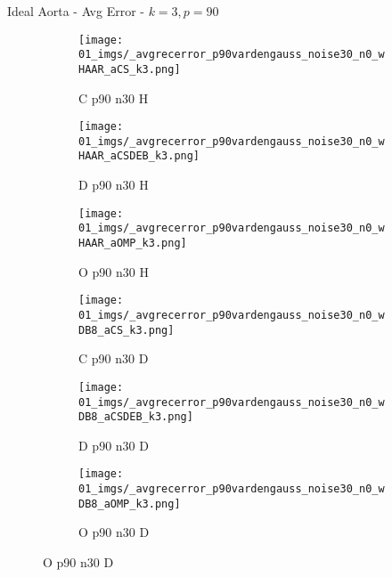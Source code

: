 \begin{frame}{Ideal Aorta - Avg Error - $k=3,p=90$}{}
\begin{figure}
\begin{subfigure}{0.13\textwidth}
\texttt{[image: 01\_imgs/\_avgrecerror\_p90vardengauss\_noise30\_n0\_wHAAR\_aCS\_k3.png]}
\caption*{\tiny C p90 n30 H}
\end{subfigure}
\begin{subfigure}{0.13\textwidth}
\texttt{[image: 01\_imgs/\_avgrecerror\_p90vardengauss\_noise30\_n0\_wHAAR\_aCSDEB\_k3.png]}
\caption*{\tiny D p90 n30 H}
\end{subfigure}
\begin{subfigure}{0.13\textwidth}
\texttt{[image: 01\_imgs/\_avgrecerror\_p90vardengauss\_noise30\_n0\_wHAAR\_aOMP\_k3.png]}
\caption*{\tiny O p90 n30 H}
\end{subfigure}
\begin{subfigure}{0.13\textwidth}
\texttt{[image: 01\_imgs/\_avgrecerror\_p90vardengauss\_noise30\_n0\_wDB8\_aCS\_k3.png]}
\caption*{\tiny C p90 n30 D}
\end{subfigure}
\begin{subfigure}{0.13\textwidth}
\texttt{[image: 01\_imgs/\_avgrecerror\_p90vardengauss\_noise30\_n0\_wDB8\_aCSDEB\_k3.png]}
\caption*{\tiny D p90 n30 D}
\end{subfigure}
\begin{subfigure}{0.13\textwidth}
\texttt{[image: 01\_imgs/\_avgrecerror\_p90vardengauss\_noise30\_n0\_wDB8\_aOMP\_k3.png]}
\caption*{\tiny O p90 n30 D}
\end{subfigure}
\end{figure}
\end{frame}


